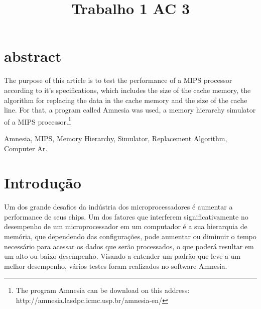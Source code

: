 \documentclass[conference]{IEEEtran}
\begin{document}
\title{Trabalho 1 AC 3}

\author{
\and
{}
}

\maketitle

\section{abstract}
The purpose of this article is to test the performance of a MIPS processor according to it’s specifications, which includes the size of the cache memory, the algorithm for replacing the data in the cache memory and the size of the cache line. For that, a program called Amnesia was used, a memory hierarchy simulator of a MIPS processor.\footnote{The program Amnesia can be download on this address: http://amnesia.lasdpc.icmc.usp.br/amnesia-en/}

\begin{IEEEkeywords}
Amnesia, MIPS, Memory Hierarchy, Simulator, Replacement Algorithm, Computer Ar.
\end{IEEEkeywords}

\section{Introdução}
Um dos grande desafios da indústria dos microprocessadores é aumentar a performance de seus chips. Um dos fatores que interferem significativamente no desempenho de um microprocessador em um computador é a sua hierarquia de memória, que dependendo das configurações, pode aumentar ou diminuir o tempo necessário para acessar os dados que serão processados, o que poderá resultar em um alto ou baixo desempenho. Visando a entender um padrão que leve a um melhor desempenho, vários testes foram realizados no software Amnesia.
\end{document}
